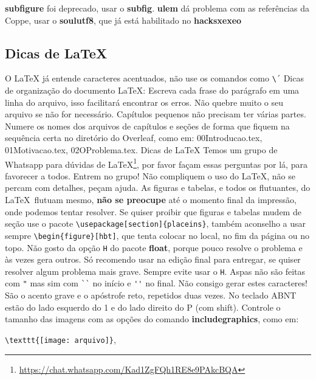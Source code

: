 \documentclass{article}
\begin{document}
\begin{outline}
    \1 \textbf{subfigure} foi deprecado, usar o \textbf{subfig}.
    \1 \textbf{ulem} dá problema com as referências da Coppe, usar o \textbf{soulutf8}, que já está habilitado no \textbf{hacksxexeo}
\end{outline}

\subsection{Dicas de \LaTeX}

\begin{outline}
\1 O LaTeX já entende caracteres acentuados, não use os comandos como \verb|\´|
\1 Dicas de organização do documento \LaTeX:
\2 Escreva cada frase do parágrafo em uma linha do arquivo, isso facilitará encontrar os erros.
\2 Não quebre muito o seu arquivo se não for necessário. Capítulos pequenos não precisam ter várias partes.
\2 Numere os nomes dos arquivos de capítulos e seções de forma que fiquem na sequência certa no diretório do Overleaf, como em: 00Introducao.tex, 01Motivacao.tex, 02OProblema.tex.
\1 Dicas de \LaTeX
\2 Temos um grupo de Whatsapp para dúvidas de \LaTeX\footnote{\url{https://chat.whatsapp.com/Kad1ZgFQh1RE8e9PAkcBQA}}, por favor façam essas perguntas por lá, para favorecer a todos. Entrem no grupo!
\2 Não compliquem o uso do \LaTeX, não se percam com detalhes, peçam ajuda. 
\2 As figuras e tabelas, e todos os flutuantes, do \LaTeX\  flutuam mesmo, \textbf{não se preocupe} até o momento final da impressão, onde podemos tentar resolver. 
\3 Se quiser proibir que figuras e tabelas mudem de seção use o pacote \verb!\usepackage[section]{placeins}!, também aconselho a usar sempre \verb!\begin{figure}[hbt]!, que tenta colocar no local, no fim da página ou no topo. 
\3 Não gosto da opção \verb!H! do pacote \textbf{float}, porque pouco resolve o problema e às vezes gera outros. Só recomendo usar na edição final para entregar, se quiser resolver algum problema mais grave. Sempre evite usar o \verb!H!.
\2 Aspas não são feitas com \verb!"! mas sim com \verb!``! no início e \verb!''! no final.
\3 Não consigo gerar estes caracteres! São o acento grave e o apóstrofe reto, repetidos duas vezes. No teclado ABNT estão do lado esquerdo do 1 e do lado direito do P (com shift). 
\2 Controle o tamanho das imagens com as opções do comando \textbf{includegraphics}, como em:

 \verb!\texttt{[image: arquivo]}!, 
 

\end{outline}
\end{document}
